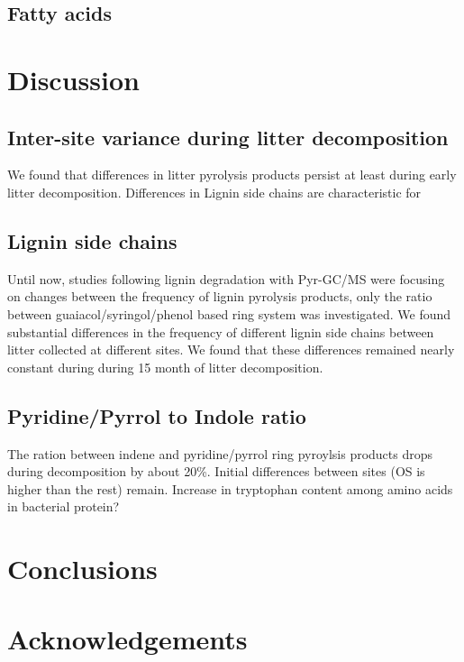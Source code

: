 \documentclass[preprint,review,12pt]{elsarticle}
\begin{document}
\subsection{Fatty acids}

\section{Discussion}

\subsection{Inter-site variance during litter decomposition}
We found that differences in litter pyrolysis products persist at least during early litter decomposition. Differences in Lignin side chains are characteristic for 

\subsection{Lignin side chains}
Until now, studies following lignin degradation with Pyr-GC/MS were focusing on changes between the frequency of lignin pyrolysis products, only the ratio between guaiacol/syringol/phenol based ring system was investigated. We found substantial differences in the frequency of different lignin side chains between litter collected at different sites. We found that these differences remained nearly constant during during 15 month of litter decomposition. 

\subsection{Pyridine/Pyrrol to Indole ratio}

The ration between indene and pyridine/pyrrol ring pyroylsis products drops during decomposition by about 20\%. Initial differences between sites (OS is higher than the rest) remain. 
Increase in tryptophan content among amino acids in bacterial protein?

\section{Conclusions}


\section{Acknowledgements}

\end{document}
